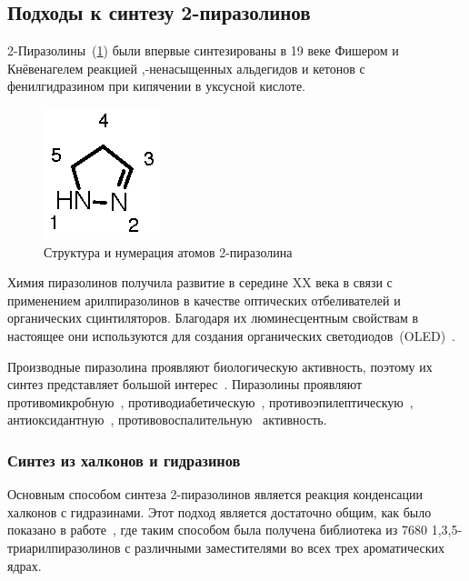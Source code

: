 \subsection{Подходы к синтезу 2-пиразолинов}
2-Пиразолины~(\ref{fig:pyrazoline_structure}) были впервые синтезированы в 19 веке Фишером и Кнёвенагелем реакцией \chemalpha,\chembeta-ненасыщенных альдегидов и кетонов с фенилгидразином при кипячении в уксусной кислоте.

\begin{figure}[h!]
    \centering
    \includegraphics{sections/literature/img/pyrazoline_structure.eps}
    \caption{Структура и нумерация атомов 2-пиразолина}
    \label{fig:pyrazoline_structure}
\end{figure}

Химия пиразолинов получила развитие в середине XX века в связи с применением арилпиразолинов в качестве оптических отбеливателей и органических сцинтиляторов.
Благодаря их люминесцентным свойствам в настоящее они используются для создания органических светодиодов~(OLED)~\cite{Stakhira2012,Ramkumar2015,Vandana2016}.

Производные пиразолина проявляют биологическую активность, поэтому их синтез представляет большой интерес~\cite{Salian2018, Singh2018,Korablina2016}.
Пиразолины проявляют противомикробную~\cite{Hassan2013}, противодиабетическую~\cite{Ahn2004}, противоэпилептическую~\cite{GunizKucukguzel2000}, антиоксидантную~\cite{Jagadish2013}, противовоспалительную~\cite{Barsoum2006} активность.

\subsubsection{Синтез из халконов и гидразинов}

Основным способом синтеза 2-пиразолинов является реакция конденсации халконов с гидразинами.
Этот подход является достаточно общим, как было показано в работе~\cite{Powers1998}, где таким способом была получена библиотека из \num{7680} 1,3,5-триарилпиразолинов с различными заместителями во всех трех ароматических ядрах.

